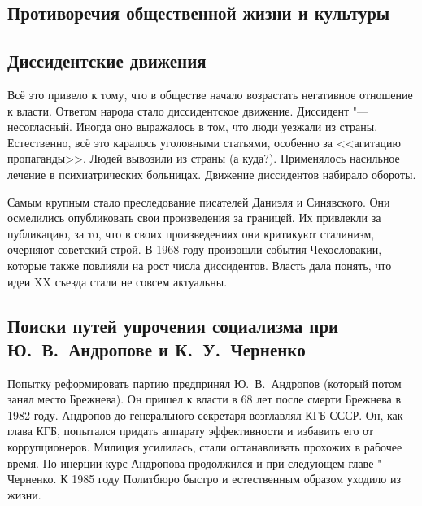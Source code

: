 \subsection{Противоречия общественной жизни и культуры}



\subsection{Диссидентские движения}

Всё это привело к тому, что в обществе начало возрастать негативное отношение к власти. Ответом народа стало диссидентское движение. Диссидент "--- несогласный. Иногда оно выражалось в том, что люди уезжали из страны. Естественно, всё это каралось уголовными статьями, особенно за <<агитацию пропаганды>>. Людей вывозили из страны (а куда?). Применялось насильное лечение в психиатрических больницах. 
Движение диссидентов набирало обороты. 


Самым крупным стало преследование писателей Даниэля и Синявского. Они осмелились опубликовать свои произведения за границей. Их привлекли за публикацию, за то, что в своих произведениях они критикуют сталинизм, очерняют советский строй. В 1968 году произошли события Чехословакии, которые также повлияли на рост числа диссидентов. Власть дала понять, что идеи XX съезда стали не совсем актуальны.

\subsection{Поиски путей упрочения социализма при Ю.~В.~Андропове и К.~У.~Черненко}

Попытку реформировать партию предпринял Ю.~В.~Андропов (который потом занял место Брежнева). 
Он пришел к власти в 68 лет после смерти Брежнева в 1982 году. Андропов до генерального секретаря возглавлял КГБ СССР. Он, как глава КГБ, попытался придать аппарату эффективности и избавить его от коррупционеров. Милиция усилилась, стали останавливать прохожих в рабочее время. По инерции курс Андропова продолжился и при следующем главе "--- Черненко. К 1985 году Политбюро быстро и естественным образом уходило из жизни.
